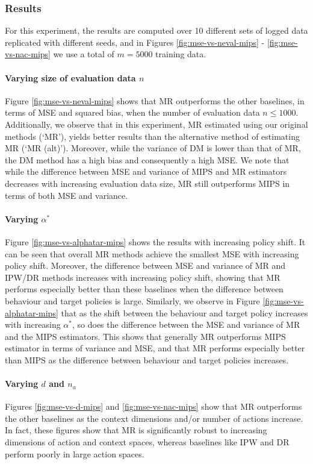 \subsubsection{Results}
For this experiment, the results are computed over 10 different sets of logged data replicated with different seeds, and in Figures \ref{fig:mse-vs-neval-mips} - \ref{fig:mse-vs-nac-mips} we use a total of $m=5000$ training data. 

\paragraph{Varying size of evaluation data $n$}
Figure \ref{fig:mse-vs-neval-mips} shows that MR outperforms the other baselines, in terms of MSE and squared bias, when the number of evaluation data $n\leq 1000$. Additionally, we observe that in this experiment, MR estimated using our original methods (`MR'), yields better results than the alternative method of estimating MR (`MR (alt)'). Moreover, while the variance of DM is lower than that of MR, the DM method has a high bias and consequently a high MSE. We note that while the difference between MSE and variance of MIPS and MR estimators decreases with increasing evaluation data size, MR still outperforms MIPS in terms of both MSE and variance.

\paragraph{Varying $\alpha^\ast$}
Figure \ref{fig:mse-vs-alphatar-mips} shows the results with increasing policy shift. It can be seen that overall MR methods achieve the smallest MSE with increasing policy shift. Moreover, the difference between MSE and variance of MR and IPW/DR methods increases with increasing policy shift, showing that MR performs especially better than these baselines when the difference between behaviour and target policies is large. Similarly, we observe in Figure \ref{fig:mse-vs-alphatar-mips} that as the shift between the behaviour and target policy increases with increasing $\alpha^\ast$, so does the difference between the MSE and variance of MR and the MIPS estimators. This shows that generally MR outperforms MIPS estimator in terms of variance and MSE, and that MR performs especially better than MIPS as the difference between behaviour and target policies increases.

\paragraph{Varying $d$ and $n_a$}
Figures \ref{fig:mse-vs-d-mips} and \ref{fig:mse-vs-nac-mips} show that MR outperforms the other baselines as the context dimensions and/or number of actions increase. In fact, these figures show that MR is significantly robust to increasing dimensions of action and context spaces, whereas baselines like IPW and DR perform poorly in large action spaces.

